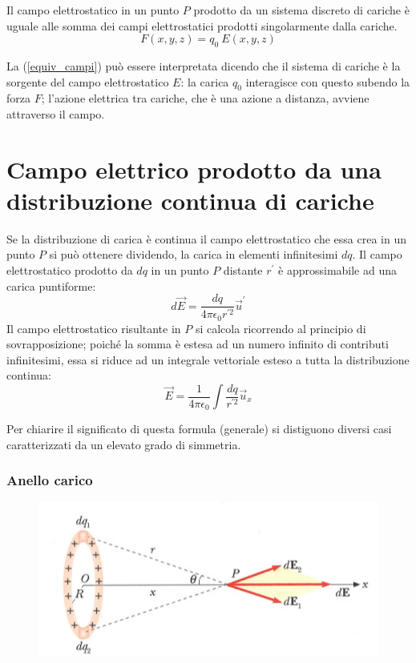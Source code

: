 \documentclass[class=book, crop=false, oneside, 12pt]{standalone}
\begin{document}
Il campo elettrostatico in un punto \(P\) prodotto da un sistema discreto di cariche è uguale alle somma dei campi elettrostatici prodotti singolarmente dalla cariche.
\begin{equation} \label{equiv_campi}
    F ( x, y, z) = q_0 \ E ( x, y, z) 
\end{equation}

La (\ref{equiv_campi}) può essere interpretata dicendo che il sistema di cariche è la sorgente del campo elettrostatico \(E\): la carica \(q_0\) interagisce con questo subendo la forza \(F\); 
l'azione elettrica tra cariche, che è una azione a distanza, avviene attraverso il campo. 

\section{Campo elettrico prodotto da una distribuzione continua di cariche}

Se la distribuzione di carica è continua il campo elettrostatico che essa crea in un punto \(P\) si può ottenere dividendo, la carica in elementi infinitesimi \(dq\).  
Il campo elettrostatico prodotto da \(dq\) in un punto \(P\) distante \(r^{\prime}\) è approssimabile ad una carica puntiforme: 
\begin{equation*}
    d \overrightarrow{E} = \frac{d q}{4 \pi \epsilon_0 r^{\prime 2}} \overrightarrow{u}^{\prime}
\end{equation*}
Il campo elettrostatico risultante in \(P\) si calcola ricorrendo al principio di sovrapposizione; poiché la somma è estesa ad un numero infinito di contributi infinitesimi, essa si riduce ad un integrale vettoriale esteso a tutta la distribuzione continua:
\begin{equation}
    \overrightarrow{E} = \frac{1}{4 \pi \epsilon_0} \int \frac{dq}{r^{\prime 2}} \overrightarrow{u}_x
\end{equation}

Per chiarire il significato di questa formula (generale) si distiguono diversi casi caratterizzati da un elevato grado di simmetria.

\subsubsection*{Anello carico}

\begin{figure}[h]
    \includegraphics[scale=0.4]{anello_carico.png}
    \centering
    \caption{}
\end{figure}
\end{document}
